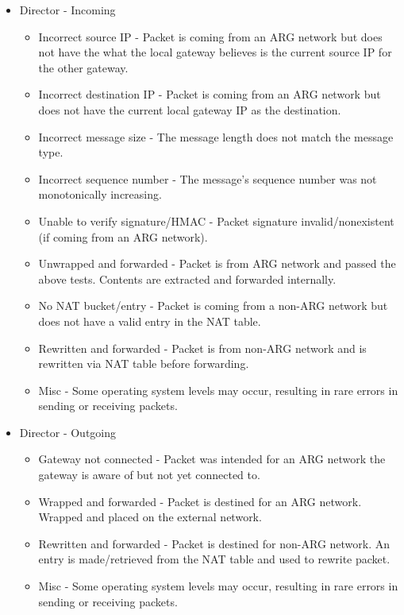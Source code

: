 \begin{itemize}
\item Director - Incoming
	\begin{itemize}
	\item Incorrect source \ac{IP} - Packet is coming from an \ac{ARG} network but does not have the what the local gateway believes is the current source IP for the other gateway.
	\item Incorrect destination \ac{IP} - Packet is coming from an \ac{ARG} network but does not have the current local gateway \ac{IP} as the destination.
	\item Incorrect message size - The message length does not match the message type.
	\item Incorrect sequence number - The message's sequence number was not monotonically increasing. 
	\item Unable to verify signature/\ac{HMAC} - Packet signature invalid/nonexistent (if coming from an \ac{ARG} network).
	\item Unwrapped and forwarded - Packet is from \ac{ARG} network and passed the above tests. Contents are extracted and forwarded internally.

	\item No \ac{NAT} bucket/entry - Packet is coming from a non-\ac{ARG} network but does not have a valid entry in the \ac{NAT} table.
	\item Rewritten and forwarded - Packet is from non-\ac{ARG} network and is rewritten via \ac{NAT} table before forwarding.

	\item Misc - Some operating system levels may occur, resulting in rare errors in sending or receiving packets.
	\end{itemize}

\item Director - Outgoing
	\begin{itemize}
	\item Gateway not connected - Packet was intended for an ARG network the gateway is aware of but not yet connected to.
	\item Wrapped and forwarded - Packet is destined for an \ac{ARG} network. Wrapped and placed on the external network.

	\item Rewritten and forwarded - Packet is destined for non-\ac{ARG} network. An entry is made/retrieved from the \ac{NAT} table and used to rewrite packet.

	\item Misc - Some operating system levels may occur, resulting in rare errors in sending or receiving packets.
	\end{itemize}
\end{itemize}

